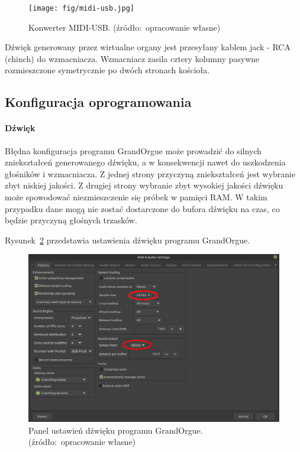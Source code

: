 \documentclass[11pt]{report}
\begin{document}
    \begin{figure}[!htp]
        \centering
        \texttt{[image: fig/midi-usb.jpg]}
        \caption{Konwerter MIDI-USB. (źródło:~opracowanie własne)}
        \label{fig:midiusb}
    \end{figure}

    Dźwięk generowany przez wirtualne organy jest przesyłany kablem jack - RCA (chinch) do wzmacniacza.
    Wzmacniacz zasila cztery kolumny pasywne rozmieszczone symetrycznie po dwóch stronach kościoła.

    \subsection{Konfiguracja oprogramowania}

    \paragraph{Dźwięk}
    Błędna konfiguracja programu GrandOrgue może prowadzić do silnych zniekształceń generowanego dźwięku, a w konsekwencji nawet do uszkodzenia głośników i wzmacniacza.
    Z jednej strony przyczyną zniekształceń jest wybranie zbyt niskiej jakości.
    Z drugiej strony wybranie zbyt wysokiej jakości dźwięku może spowodować niezmieszczenie się próbek w pamięci RAM.
    W takim przypadku dane mogą nie zostać dostarczone do bufora dźwięku na czas, co będzie przyczyną głośnych trzasków.

    Rysunek~\ref{fig:ustawienia-dzwieku} przedstawia ustawienia dźwięku programu GrandOrgue.
    \begin{figure}[!ht]
        \centering
        \includegraphics[width=\linewidth]{fig/optionsR.png}
        \caption{Panel ustawień dźwięku programu GrandOrgue. (źródło:~opracowanie własne)}
        \label{fig:ustawienia-dzwieku}
    \end{figure}
\end{document}
